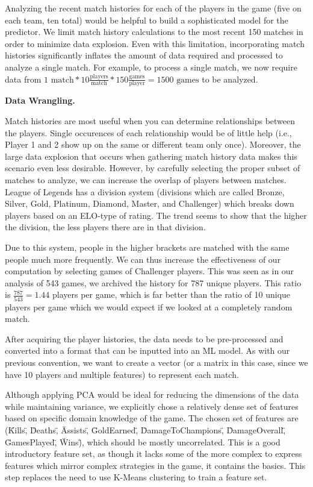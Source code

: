 Analyzing the recent match histories for each of the players in the game 
(five on each team, ten total) would be helpful to build a sophisticated model for the predictor.  
We limit match history calculations to the most recent 150 matches in order to 
minimize data explosion.  Even with this 
limitation, incorporating match histories significantly inflates the amount of 
data required and processed to analyze a single match.  
For example, to process a single match, we now require data from $1 \mbox{ match} * 10 \frac{\mbox{players}}{\mbox{match}} * 150 \frac{\mbox{games}}{\mbox{player}} = 1500 \mbox{ games}$ to be analyzed. 

\textbf{Data Wrangling. }

Match histories are most useful when you can determine relationships between the players. 
Single occurences of each relationship would be of little help (i.e., Player 1 and 2 show up on the same or different team only once).
Moreover, the large data explosion that occurs when gathering match history data makes this scenario even less desirable.  However, by carefully selecting the proper subset of matches to analyze, we can increase the overlap of players between matches. League of Legends has a division system (divisions which are called Bronze, Silver, Gold, Platinum, Diamond, Master, and Challenger) which breaks down players based on an ELO-type of rating. The trend seems to show that the higher the division, the less players there are in that division. 


Due to this system, people in the higher brackets are matched with the same people much more frequently. We can thus increase the effectiveness of our computation by selecting games of Challenger players. This was seen as in our analysis of 543 games, we archived the history for 787 unique players. This ratio is $\frac{787}{543} = 1.44$ players per game, which is far better than the ratio of 10 unique players per game which we would expect if we looked at a completely random match. 

After acquiring the player histories, the data needs to be pre-processed and converted into a format that can be inputted into an ML model.  As with our previous convention, we want to create a vector (or a matrix in this case, since we have 10 players and multiple features) to represent each match. 

Although applying PCA would be ideal for reducing the dimensions of the data while maintaining variance, we explicitly chose a relatively dense set of features based on 
specific domain knowledge of the game.  The chosen set of features are (\"Kills\", \"Deaths\", \"Assists\", \"GoldEarned\", \"DamageToChampions\", \"DamageOverall\", \"GamesPlayed\", \"Wins\"), which should be mostly uncorrelated. This is a good introductory feature set, as though it lacks some of the more complex to express features which mirror complex strategies in the game, it contains the basics.  This step replaces the need to use K-Means clustering to train a feature set. 

